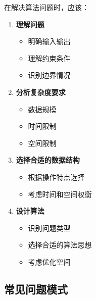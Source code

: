 在解决算法问题时，应该：
\begin{enumerate}
  \item \textbf{理解问题}
    \begin{itemize}
      \item 明确输入输出
      \item 理解约束条件
      \item 识别边界情况
    \end{itemize}

  \item \textbf{分析复杂度要求}
    \begin{itemize}
      \item 数据规模
      \item 时间限制
      \item 空间限制
    \end{itemize}

  \item \textbf{选择合适的数据结构}
    \begin{itemize}
      \item 根据操作特点选择
      \item 考虑时间和空间权衡
    \end{itemize}

  \item \textbf{设计算法}
    \begin{itemize}
      \item 识别问题类型
      \item 选择合适的算法思想
      \item 考虑优化空间
    \end{itemize}
\end{enumerate}

\subsection{常见问题模式}

